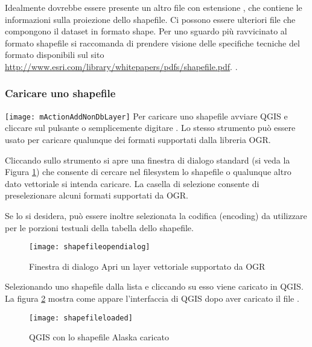 Idealmente dovrebbe essere presente un altro file con estensione
, che contiene le informazioni sulla proiezione dello
shapefile. Ci possono essere ulteriori file che compongono il dataset in
formato shape. Per uno sguardo più ravvicinato al formato shapefile si
raccomanda di prendere visione delle specifiche tecniche del formato
disponibili sul sito \url{http://www.esri.com/library/whitepapers/pdfs/shapefile.pdf}.
.

\subsubsection{Caricare uno shapefile}\label{sec:load_shapefile}
\texttt{[image: mActionAddNonDbLayer]} 
Per caricare uno shapefile avviare QGIS e cliccare sul pulsante
 o semplicemente digitare . Lo stesso
strumento può essere usato per caricare qualunque dei formati supportati dalla
libreria OGR.

Cliccando sullo strumento si apre una finestra di dialogo standard (si veda la
Figura \ref{fig:openshapefile}) che consente di cercare nel filesystem lo
shapefile o qualunque altro dato vettoriale si intenda caricare. 
La casella di selezione  consente di
preselezionare alcuni formati supportati da OGR.

Se lo si desidera, può essere inoltre selezionata la codifica (encoding) da utilizzare per le
porzioni testuali della tabella dello shapefile.

\begin{figure}[ht]
   \begin{center}
   \caption{Finestra di dialogo Apri un layer vettoriale supportato da OGR \nixcaption}\label{fig:openshapefile}\smallskip
   \texttt{[image: shapefileopendialog]}
\end{center} 
\end{figure}

Selezionando uno shapefile dalla lista e cliccando su  esso viene
caricato in QGIS. La figura \ref{fig:loadedshapefile} mostra come appare
l'interfaccia di QGIS dopo aver caricato il file .

\begin{figure}[ht]
   \begin{center}
   \caption{QGIS con lo shapefile Alaska caricato \nixcaption}\label{fig:loadedshapefile}\smallskip
   \texttt{[image: shapefileloaded]}
\end{center} 
\end{figure}

